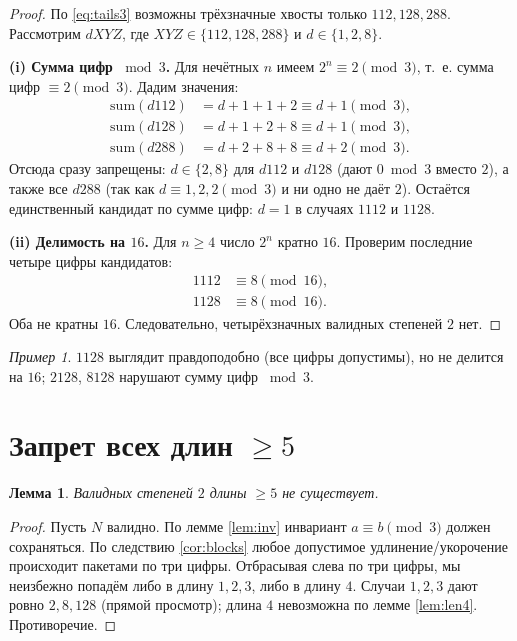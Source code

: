\documentclass[12pt]{article}
\theoremstyle{plain}
\newtheorem{lemma}{Лемма}
\theoremstyle{remark}
\newtheorem*{example}{Пример}
\begin{document}
\begin{proof}
По \eqref{eq:tails3} возможны трёхзначные хвосты только $112,128,288$. Рассмотрим $dXYZ$, где $XYZ\in\{112,128,288\}$ и $d\in\{1,2,8\}$.

\smallskip
\noindent\textbf{(i) Сумма цифр $\bmod 3$.} Для нечётных $n$ имеем $2^n\equiv2\pmod3$, т.~е. сумма цифр $\equiv2\pmod3$. Дадим значения:
\begin{align*}
\mathrm{sum}(d112)&=d+1+1+2\equiv d+1\pmod3,\\
\mathrm{sum}(d128)&=d+1+2+8\equiv d+1\pmod3,\\
\mathrm{sum}(d288)&=d+2+8+8\equiv d+2\pmod3.
\end{align*}
Отсюда сразу запрещены: $d\in\{2,8\}$ для $d112$ и $d128$ (дают $0\bmod3$ вместо $2$), а также все $d288$ (так как $d\equiv1,2,2\pmod3$ и ни одно не даёт $2$). Остаётся единственный кандидат по сумме цифр: $d=1$ в случаях $1112$ и $1128$.

\smallskip
\noindent\textbf{(ii) Делимость на $16$.} Для $n\ge4$ число $2^n$ кратно $16$. Проверим последние четыре цифры кандидатов:
\begin{align*}
1112 &\equiv 8 \pmod{16},\\
1128 &\equiv 8 \pmod{16}.
\end{align*}
Оба не кратны $16$. Следовательно, четырёхзначных валидных степеней $2$ нет.
\end{proof}

\begin{example}
$1128$ выглядит правдоподобно (все цифры допустимы), но не делится на $16$; $2128$, $8128$ нарушают сумму цифр $\bmod3$.
\end{example}

\section{Запрет всех длин $\ge5$}
\begin{lemma}\label{lem:len5}
Валидных степеней $2$ длины $\ge5$ не существует.
\end{lemma}

\begin{proof}
Пусть $N$ валидно. По лемме \ref{lem:inv} инвариант $a\equiv b\pmod3$ должен сохраняться. По следствию \ref{cor:blocks} любое допустимое удлинение/укорочение происходит пакетами по три цифры. Отбрасывая слева по три цифры, мы неизбежно попадём либо в длину $1,2,3$, либо в длину $4$. Случаи $1,2,3$ дают ровно $2,8,128$ (прямой просмотр); длина $4$ невозможна по лемме \ref{lem:len4}. Противоречие.
\end{proof}
\end{document}
